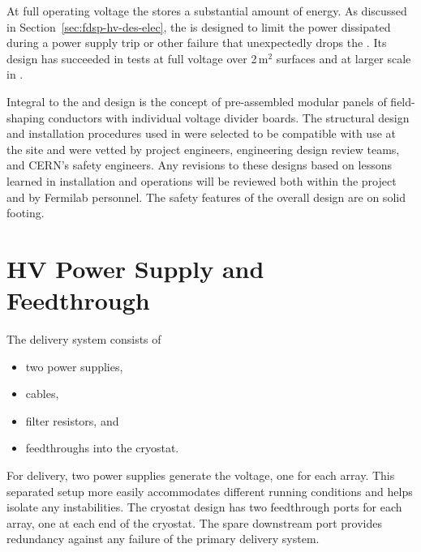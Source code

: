At full operating voltage the  stores a substantial amount of energy.
As discussed in Section~\ref{sec:fdsp-hv-des-elec}, the  is designed to limit the power dissipated during a power supply trip or other failure that unexpectedly drops the .
Its design has succeeded in tests at full voltage over \num{2}\,m$^2$ surfaces and at larger scale in .  

Integral to the  and  design is the concept of pre-assembled modular panels of field-shaping conductors with individual voltage divider boards. The structural design and installation procedures used in  were selected to be compatible with use at the  site and were vetted by project engineers, engineering design review teams, and CERN's safety engineers. Any revisions to these designs based on lessons learned in   installation and operations will be reviewed both within the project and by Fermilab  personnel. The safety features of the overall design are on solid footing. 




\section {HV Power Supply and Feedthrough}

The  delivery system consists of
\begin{itemize}
\item two power supplies,
\item {} cables,
\item filter resistors, and
\item {} feedthroughs into the cryostat.
\end{itemize}

For  delivery, two power supplies generate the voltage, one for each  array. 
This separated setup more easily accommodates different running conditions and helps isolate any instabilities. 
The cryostat design has two feedthrough ports for each  array, one at each end of the cryostat. The spare downstream port provides redundancy against any failure of the primary  delivery system. 

